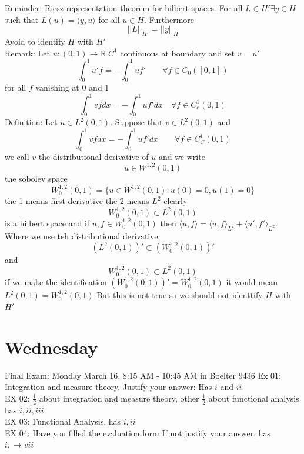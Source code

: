 \documentclass[11pt]{article}
\begin{document}
Reminder: Riesz representation theorem for hilbert spaces.
For all $L \in H' \exists y \in H$ such that $L(u) = \langle y , u \rangle$ for all $u \in H$.
Furthermore
\[
    ||L||_{H'} = ||y||_{H}
\] 
Avoid to identify $H$ with $H'$\\
Remark: Let $u : (0,1) \to \mathbb{R}$ $C^{1}$ continuous at boundary and set $v = u'$ 
\[
    \int_{0}^{1}u' f = - \int_{0}^{1}uf' \qquad \forall f \in C_0([0,1])
\] 
for all $f$ vanishing at 0 and 1
\[
\int_{0}^{1}vf dx = - \int_{0}^{1}uf'dx \quad \forall f \in C^1_c(0,1)
\] 
Definition: Let $u  \in L^2(0,1)$. Suppose that $v \in L^2(0,1)$ and 
 \[
\int_{0}^{1}vfdx = -\int_{0}^{1}u f'dx \qquad \forall f \in C_C^{1}(0,1)
\] 
we call $v$ the distributional derivative of $u$ and we write
\[
u  \in W^{1,2}(0,1)
\] 
the sobolev space
\[
    W_0^{1,2}(0,1) = \{u \in W^{1,2}(0,1): u(0) = 0, u(1) = 0\}
\] 
the 1 means first derivative the 2 means $L^2$ clearly
\[
W_0^{1,2}(0,1) \subset L^2(0,1)
\] 
is a hilbert space and if $u,f \in W_0^{1,2}(0,1)$ then $\langle u , f \rangle = \langle u, f \rangle_{L^2} + \langle u', f' \rangle_{L^2}$.
Where we use teh distributional derivative.
\[
    (L^2(0,1))' \subset (W_0^{1,2}(0,1))'
\] 
and
\[
W_0^{1,2}(0,1) \subset L^2(0,1)
\] 
if we make the identification $(W_0^{1,2}(0,1))' = W_0^{1,2}(0,1)$ it would mean $L^2(0,1) = W_0^{1,2}(0,1)$
But this is not true so we should not identtify $H$ with $H'$

\section{Wednesday}
Final Exam: Monday March 16, 8:15 AM - 10:45 AM in Boelter 9436
Ex 01: Integration and measure theory, Justify your answer: Has $i$ and $ii$\\
EX 02: $\frac{1}{2}$ about integration and measure theory, other $\frac{1}{2}$ about functional analysis has $i,ii,iii$\\
EX 03: Functional Analysis, has $i,ii$\\
EX 04: Have you filled the evaluation form If not justify your answer, has $i, \to vii$\\
\end{document}
